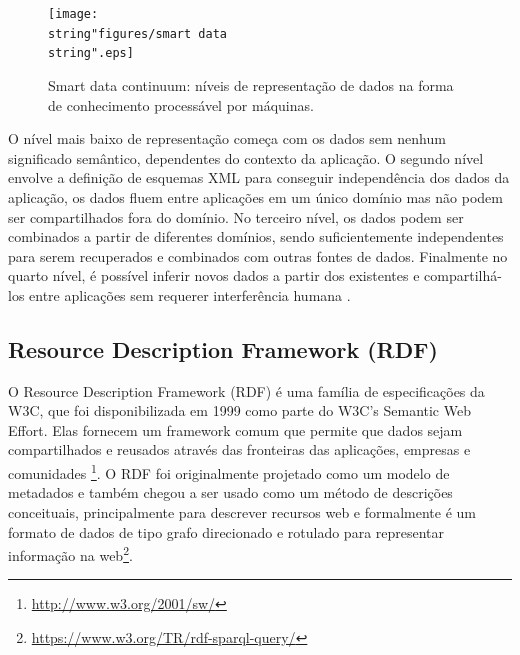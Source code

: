 \begin{figure}[H]
\begin{centering}
\texttt{[image: \\string"figures/smart data\\string".eps]}\caption{\foreignlanguage{english}{Smart data continuum\foreignlanguage{brazil}{: níveis de representação
de dados na forma de conhecimento processável por máquinas.\label{fig:Smart-data-continuum}}}}
\par\end{centering}
\end{figure}

O nível mais baixo de representação começa com os dados sem nenhum
significado semântico, dependentes do contexto da aplicação. O segundo
nível envolve a definição de esquemas \foreignlanguage{english}{XML}
para conseguir independência dos dados da aplicação, os dados fluem
entre aplicações em um único domínio mas não podem ser compartilhados
fora do domínio. No terceiro nível, os dados podem ser combinados
a partir de diferentes domínios, sendo suficientemente independentes
para serem recuperados e combinados com outras fontes de dados. Finalmente
no quarto nível, é possível inferir novos dados a partir dos existentes
e compartilhá-los entre aplicações sem requerer interferência humana
\citep{sugumaran2011}.
%

\subsection*{Resource Description Framework\foreignlanguage{brazil}{ (}RDF\foreignlanguage{brazil}{)}}

%
O \foreignlanguage{english}{Resource Description Framework (RDF)}
é uma família de especificações da W3C, que foi disponibilizada em
1999 como parte do W3C's \foreignlanguage{english}{Semantic Web Effort}.
Elas fornecem um \foreignlanguage{english}{framework} comum que permite
que dados sejam compartilhados e reusados através das fronteiras das
aplicações, empresas e comunidades \footnote{\url{http://www.w3.org/2001/sw/}}.
O \foreignlanguage{english}{RDF} foi originalmente projetado como
um modelo de metadados e também chegou a ser usado como um método
de descrições conceituais, principalmente para descrever recursos
web e formalmente é um formato de dados de tipo grafo direcionado
e rotulado para representar informação na web\footnote{\url{https://www.w3.org/TR/rdf-sparql-query/}}.

